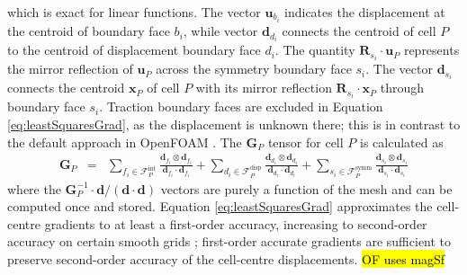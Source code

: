 \documentclass[sn-mathphys,Numbered]{sn-jnl}%
\newcommand{\bb}{\boldsymbol}
\begin{document}
which is exact for linear functions.
The vector $\bb{u}_{b_i}$ indicates the displacement at the centroid of boundary face ${b_i}$, while vector $\bb{d}_{d_i}$ connects the centroid of cell $P$ to the centroid of displacement boundary face $d_i$.
The quantity $\bb{R}_{s_i} \cdot \bb{u}_P$ represents the mirror reflection of $\bb{u}_P$ across the symmetry boundary face $s_i$.
The vector $\bb{d}_{s_i}$ connects the centroid $\bb{x}_P$ of cell $P$ with its mirror reflection $\bb{R}_{s_i}  \cdot \bb{x}_P$ through boundary face $s_i$.
Traction boundary faces are excluded in Equation \ref{eq:leastSquaresGrad}, as the displacement is unknown there; this is in contrast to the default approach in OpenFOAM \citep{Jasak2011}.
The $\bb{G}_P$ tensor for cell $P$ is calculated as
\begin{eqnarray}
	 \bb{G}_P &=&
	 \sum_{{f_i} \in \mathcal{F}^{\text{int}}_P} \frac{\bb{d}_{f_i} \otimes \bb{d}_{f_i}}{\bb{d}_{f_i} \cdot \bb{d}_{f_i}}
	 +  \sum_{{d_i} \in \mathcal{F}^{\text{disp}}_P} \frac{\bb{d}_{d_i} \otimes \bb{d}_{d_i}}{\bb{d}_{d_i} \cdot \bb{d}_{d_i}}
	 +  \sum_{{s_i} \in \mathcal{F}^{\text{symm}}_P} \frac{\bb{d}_{s_i} \otimes \bb{d}_{s_i}}{\bb{d}_{s_i} \cdot \bb{d}_{s_i}}
\end{eqnarray}
where the $\bb{G}^{-1}_P \cdot \bb{d}/(\bb{d}\cdot \bb{d})$ vectors are purely a function of the mesh and can be computed once and stored.
Equation \ref{eq:leastSquaresGrad} approximates the cell-centre gradients to at least a first-order accuracy, increasing to second-order accuracy on certain smooth grids \citep{Syrakos2023};
first-order accurate gradients are sufficient to preserve second-order accuracy of the cell-centre displacements. \hl{OF uses magSf}
\end{document}
